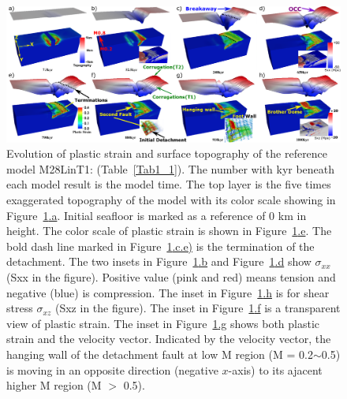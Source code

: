 \begin{figure}[h]
  \centering
    \includegraphics[width=1.0\textwidth]{./Figures/fig_Results1_1.png}
  \caption{Evolution of plastic strain and surface topography of the reference model M28LinT1: (Table~\hyperref[Tab1_1]{\ref{Tab1_1}}). The number with kyr beneath each model result is the model time. The top layer is the five times exaggerated topography of the model with its color scale showing in Figure~\hyperref[fig_Results1_1]{\ref{fig_Results1_1}.a}. Initial seafloor is marked as a reference of 0 km in height. The color scale of plastic strain is shown in Figure~\hyperref[fig_Results1_1]{\ref{fig_Results1_1}.e}. The bold dash line marked in Figure~\hyperref[fig_Results1_1]{\ref{fig_Results1_1}.c.e)} is the termination of the detachment. The two insets in Figure~\hyperref[fig_Results1_1]{\ref{fig_Results1_1}.b} and Figure~\hyperref[fig_Results1_1]{\ref{fig_Results1_1}.d} show $\sigma_{xx}$ (Sxx in the figure). Positive value (pink and red) means tension and negative (blue) is compression. The inset in Figure~\hyperref[fig_Results1_1]{\ref{fig_Results1_1}.h} is for shear stress $\sigma_{xz}$ (Sxz in the figure). The inset in Figure~\hyperref[fig_Results1_1]{\ref{fig_Results1_1}.f} is a transparent view of plastic strain. The inset in Figure~\hyperref[fig_Results1_1]{\ref{fig_Results1_1}.g} shows both plastic strain and the velocity vector. Indicated by the velocity vector, the hanging wall of the detachment fault at low M region (M = 0.2$\sim$0.5) is moving in an opposite direction (negative $x$-axis) to its ajacent higher M region (M $>$ 0.5).} %
 \label{fig_Results1_1}
\end{figure}   


